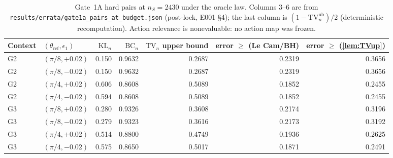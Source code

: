 \documentclass[10pt,twocolumn]{article}
\newcommand{\fn}[1]{{\small\nolinkurl{#1}}}
\theoremstyle{definition}
\theoremstyle{remark}
\newcommand{\eps}{\epsilon}
\newcommand{\TV}{\mathrm{TV}}
\newcommand{\KL}{\mathrm{KL}}
\newcommand{\BC}{\mathrm{BC}}
\begin{document}
\begin{table}[h]
\centering\small
\caption{Gate~1A hard pairs at $n_S=2430$ under the oracle law. Columns 3--6 are from \fn{results/errata/gate1a_pairs_at_budget.json} (post-lock, E001 §4); the last column is $(1-\TV_n^{\mathrm{ub}})/2$ (deterministic recomputation). Action relevance is nonevaluable: no action map was frozen.}\label{tab:pairs}
\setlength{\tabcolsep}{4pt}\begin{tabular}{@{}llrrrrr@{}}
\toprule
Context & $(\theta_{\mathrm{ref}},\eps_1)$ & $\KL_n$ & $\BC_n$ & $\TV_n$ upper bound & error $\ge$ (Le Cam/BH) & error $\ge$ (\cref{lem:TVup}) \\
\midrule
G2 & $(\pi/8,+0.02)$ & 0.150 & 0.9632 & 0.2687 & 0.2319 & 0.3656 \\
G2 & $(\pi/8,-0.02)$ & 0.150 & 0.9632 & 0.2687 & 0.2319 & 0.3656 \\
G2 & $(\pi/4,+0.02)$ & 0.606 & 0.8608 & 0.5089 & 0.1852 & 0.2455 \\
G2 & $(\pi/4,-0.02)$ & 0.594 & 0.8608 & 0.5089 & 0.1852 & 0.2455 \\
G3 & $(\pi/8,+0.02)$ & 0.280 & 0.9326 & 0.3608 & 0.2174 & 0.3196 \\
G3 & $(\pi/8,-0.02)$ & 0.279 & 0.9323 & 0.3616 & 0.2173 & 0.3192 \\
G3 & $(\pi/4,+0.02)$ & 0.514 & 0.8800 & 0.4749 & 0.1936 & 0.2625 \\
G3 & $(\pi/4,-0.02)$ & 0.575 & 0.8650 & 0.5017 & 0.1871 & 0.2491 \\
\bottomrule
\end{tabular}
\end{table}
\end{document}
